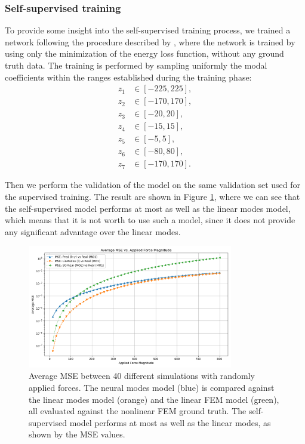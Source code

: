 \subsubsection{Self-supervised training}
\label{sec:self_supervised_training}
To provide some insight into the self-supervised training process, we trained a network following the procedure described by \cite{Wang_Du_Coros_Thomaszewski_2024}, where the network is trained by using only the minimization of the energy loss function, without any ground truth data. The training is performed by sampling uniformly the modal coefficients within the ranges established during the training phase:
\begin{align*}
    z_1 &\in [-225, 225], \\
    z_2 &\in [-170, 170], \\
    z_3 &\in [-20, 20], \\
    z_4 &\in [-15, 15], \\
    z_5 &\in [-5, 5], \\
    z_6 &\in [-80, 80], \\
    z_7 &\in [-170, 170].
\end{align*}

Then we perform the validation of the model on the same validation set used for the supervised training. The result are shown in Figure \ref{fig:self_supervised_validation_mse_comparison}, where we can see that the self-supervised model performs at most as well as the linear modes model, which means that it is not worth to use such a model, since it does not provide any significant advantage over the linear modes. 

\begin{figure}[H]
    \centering
    \includegraphics[width=0.8\textwidth]{Images/self_supervised_mse.png}
    \caption{Average MSE between 40 different simulations with randomly applied forces. The neural modes model (blue) is compared against the linear modes model (orange) and the linear FEM model (green), all evaluated against the nonlinear FEM ground truth. The self-supervised model performs at most as well as the linear modes, as shown by the MSE values.}
    \label{fig:self_supervised_validation_mse_comparison}
\end{figure}

